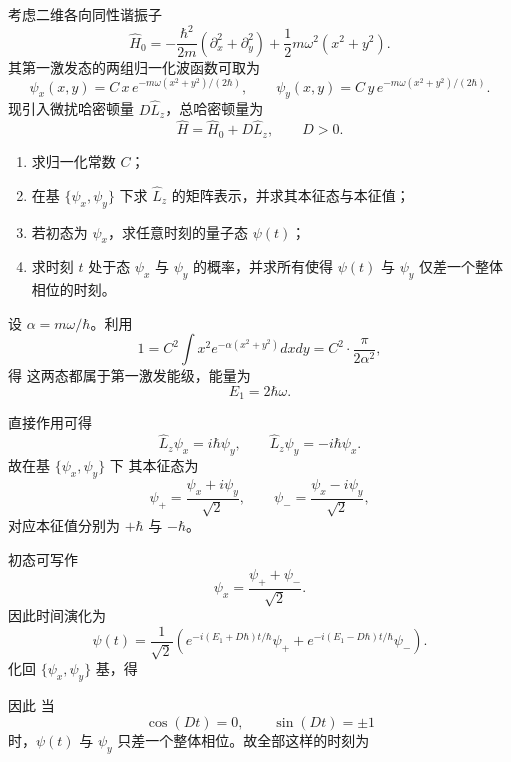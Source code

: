 \begin{question}
考虑二维各向同性谐振子
\[
\hat H_0=-\frac{\hbar^2}{2m}(\partial_x^2+\partial_y^2)+\frac12 m\omega^2(x^2+y^2).
\]
其第一激发态的两组归一化波函数可取为
\[
\psi_x(x,y)=C\,x\,e^{-m\omega(x^2+y^2)/(2\hbar)},
\qquad
\psi_y(x,y)=C\,y\,e^{-m\omega(x^2+y^2)/(2\hbar)}.
\]
现引入微扰哈密顿量 $D\hat L_z$，总哈密顿量为
\[
\hat H=\hat H_0+D\hat L_z,
\qquad D>0.
\]

\begin{enumerate}[label=(\arabic*),leftmargin=2.5em]
  \item 求归一化常数 $C$；
  \item 在基 $\{\psi_x,\psi_y\}$ 下求 $\hat L_z$ 的矩阵表示，并求其本征态与本征值；
  \item 若初态为 $\psi_x$，求任意时刻的量子态 $\psi(t)$；
  \item 求时刻 $t$ 处于态 $\psi_x$ 与 $\psi_y$ 的概率，并求所有使得 $\psi(t)$ 与 $\psi_y$ 仅差一个整体相位的时刻。
\end{enumerate}

\begin{solution}
设 $\alpha=m\omega/\hbar$。利用
\[
1=C^2\int x^2 e^{-\alpha(x^2+y^2)}dxdy=C^2\cdot \frac{\pi}{2\alpha^2},
\]
得
这两态都属于第一激发能级，能量为
\[
E_1=2\hbar\omega.
\]

直接作用可得
\[
\hat L_z\psi_x=i\hbar\psi_y,
\qquad
\hat L_z\psi_y=-i\hbar\psi_x.
\]
故在基 $\{\psi_x,\psi_y\}$ 下
其本征态为
\[
\psi_+=\frac{\psi_x+i\psi_y}{\sqrt2},
\qquad
\psi_-=\frac{\psi_x-i\psi_y}{\sqrt2},
\]
对应本征值分别为 $+\hbar$ 与 $-\hbar$。

初态可写作
\[
\psi_x=\frac{\psi_++\psi_-}{\sqrt2}.
\]
因此时间演化为
\[
\psi(t)=\frac{1}{\sqrt2}\left(e^{-i(E_1+D\hbar)t/\hbar}\psi_++e^{-i(E_1-D\hbar)t/\hbar}\psi_-\right).
\]
化回 $\{\psi_x,\psi_y\}$ 基，得

因此
当
\[
\cos(Dt)=0,
\qquad \sin(Dt)=\pm 1
\]
时，$\psi(t)$ 与 $\psi_y$ 只差一个整体相位。故全部这样的时刻为
\end{solution}
\end{question}

